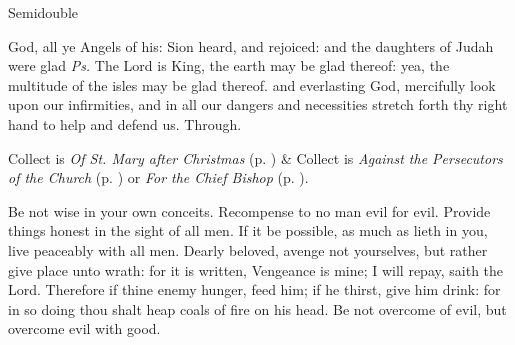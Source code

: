 \label{epiphany}
\begin{inhead}
{Semidouble}
\end{inhead}

\properantiphonfix

\introit
{} God, all ye Angels of his: Sion heard, and rejoiced: and the daughters of Judah were glad \textit{Ps.} The Lord is King, the earth may be glad thereof: yea, the multitude of the isles may be glad thereof.
\collect
{} and everlasting God, mercifully look upon our infirmities, and in all our dangers and necessities stretch forth thy right hand to help and defend us. Through.
\begin{rubric}
     Collect is \emph{Of St. Mary after Christmas} (p. \pageref{SPMaryPostChristmas}) \&  Collect is \emph{Against the Persecutors of the Church} (p. \pageref{SPAgainst}) or \emph{For the Chief Bishop} (p. \pageref{SPChiefBishop}).
\end{rubric}
 Be not wise in your own conceits. Recompense to no man evil for evil. Provide things honest in the sight of all men. If it be possible, as much as lieth in you, live peaceably with all men. Dearly beloved, avenge not yourselves, but rather give place unto wrath: for it is written, Vengeance is mine; I will repay, saith the Lord. Therefore if thine enemy hunger, feed him; if he thirst, give him drink: for in so doing thou shalt heap coals of fire on his head. Be not overcome of evil, but overcome evil with good.
